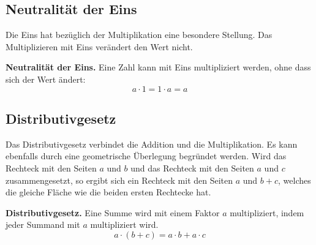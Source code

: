 \subsection{Neutralität der Eins}

Die Eins hat bezüglich der Multiplikation eine besondere Stellung. Das Multiplizieren mit Eins verändert den Wert nicht.
\begin{theorem}
  \textbf{Neutralität der Eins.} Eine Zahl kann mit Eins multipliziert werden, ohne dass sich der Wert ändert:
  \[
    a \cdot 1 = 1 \cdot a = a
  \]
\end{theorem}


\subsection{Distributivgesetz}
Das Distributivgesetz verbindet die Addition und die Multiplikation. Es kann ebenfalls durch eine geometrische Überlegung begründet werden. Wird das Rechteck mit den Seiten $a$ und $b$ und das Rechteck mit den Seiten $a$ und $c$ zusammengesetzt, so ergibt sich ein Rechteck mit den Seiten $a$ und $b+c$, welches die gleiche Fläche wie die beiden ersten Rechtecke hat.
\begin{center}
\end{center}

\begin{theorem}
  \textbf{Distributivgesetz.} Eine Summe wird mit einem Faktor $a$ multipliziert, indem jeder Summand mit $a$ multipliziert wird.
  \[
    a \cdot (b + c) = a \cdot b + a \cdot c
  \]
\end{theorem}
